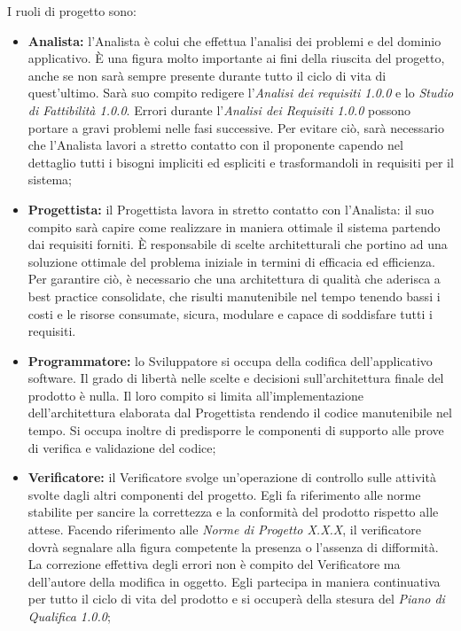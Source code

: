    			\noindent I ruoli di progetto sono:
   			\begin{itemize}
   				\item \textbf{Analista:} l'Analista è colui che effettua l'analisi dei problemi e del dominio applicativo. \`{E} una figura molto importante ai fini della riuscita del progetto, anche se non sarà sempre presente durante tutto il ciclo di vita di quest'ultimo. Sarà suo compito redigere l'\textit{Analisi dei requisiti 1.0.0\doc} e lo \textit{Studio di Fattibilità 1.0.0\doc}. Errori durante l'\textit{Analisi dei Requisiti 1.0.0\doc} possono portare a gravi problemi nelle fasi successive. Per evitare ciò, sarà necessario che l'Analista lavori a stretto contatto con il proponente capendo nel dettaglio tutti i bisogni impliciti ed espliciti e trasformandoli in requisiti per il sistema;
   				\item \textbf{Progettista:} il Progettista lavora in stretto contatto con l'Analista: il suo compito sarà capire come realizzare in maniera ottimale il sistema partendo dai requisiti forniti. È responsabile di scelte architetturali che portino ad una soluzione ottimale del problema iniziale in termini di efficacia ed efficienza. Per garantire ciò, è necessario che una architettura di qualità che aderisca a best practice consolidate, che risulti manutenibile nel tempo tenendo bassi i costi e le risorse consumate, sicura, modulare e capace di soddisfare tutti i requisiti.
   				\item \textbf{Programmatore:} lo Sviluppatore si occupa della codifica dell'applicativo software. Il grado di libertà nelle scelte e decisioni sull'architettura finale del prodotto è nulla. Il loro compito si limita all'implementazione dell'architettura elaborata dal Progettista rendendo il codice manutenibile nel tempo. Si occupa inoltre di predisporre le componenti di supporto alle prove di verifica e validazione del codice;
   				\item \textbf{Verificatore:} il Verificatore svolge un'operazione di controllo sulle attività svolte dagli altri componenti del progetto. Egli fa riferimento alle norme stabilite per sancire la correttezza e la conformità del prodotto rispetto alle attese. Facendo riferimento alle \textit{Norme di Progetto X.X.X\doc}, il verificatore dovrà segnalare alla figura competente la presenza o l'assenza di difformità. La correzione effettiva degli errori non è compito del Verificatore ma dell'autore della modifica in oggetto. Egli partecipa in maniera continuativa per tutto il ciclo di vita del prodotto e si occuperà della stesura del \textit{Piano di Qualifica 1.0.0};

\end{itemize}
